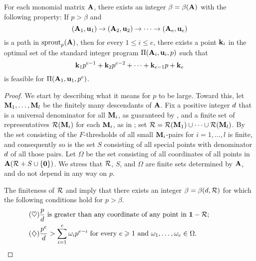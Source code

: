 \documentclass{amsart}
\begin{document}
\begin{theorem}
\label{ILL: T}
   For each monomial matrix $\mathbf{A}$, there exists an integer $\beta = \beta(\mathbf{A})$ with the following property\textup:
   If $p>\beta$ and \[ (\mathbf{A}_1, \mathbf{u}_1) \to (\mathbf{A}_2, \mathbf{u}_2) \to \cdots \to (\mathbf{A}_e, \mathbf{u}_e)\] is a path in $\operatorname{sprout}_p(\mathbf{A})$, then for every $1 \leq i \leq e$, there exists a point $\mathbf{k}_i$ in the optimal set of the standard integer program $\Pi(\mathbf{A}_i, \mathbf{u}_i,p)$  such that
   \[
      \mathbf{k}_1 p^{e-1} + \mathbf{k}_2 p^{e-2} + \cdots + \mathbf{k}_{e-1} p + \mathbf{k}_e
   \]
   is feasible for $\Pi(\mathbf{A}_1, \mathbf{u}_1, p^e)$.
 \end{theorem}

\begin{proof}
   We start by describing what it means for $p$ to be large.
   Toward this, let $\mathbf{M}_1, \ldots, \mathbf{M}_l$ be the finitely many descendants of  $\mathbf{A}$.
   Fix a positive integer $d$ that is a universal denominator for all $\mathbf{M}_i$, as guaranteed by , and a finite set of representatives $\mathcal{R}(\mathbf{M}_i)$ for each $\mathbf{M}_i$, as in ; set $\mathcal{R} = \mathcal{R}(\mathbf{M}_1) \cup \cdots \cup \mathcal{R}(\mathbf{M}_l)$.
   By  the set consisting of the $F$-thresholds of all small $\mathbf{M}_i$-pairs for $i=1,\ldots,l$ is finite, and consequently so is the set $S$ consisting of all special points with denominator $d$ of all those pairs.
   Let $\Omega$ be the set consisting of all coordinates of all points in $\mathbf{A}(\mathcal{R}+S\cup\{\mathbf{0}\})$.
   We stress that $\mathcal{R}$, $S$, and $\Omega$ are finite sets determined by $\mathbf{A}$, and do not depend in any way on $p$.

   The finiteness of $\mathcal{R}$  and 
   imply that there exists an integer $\beta = \beta(d, \mathcal{R})$ for which the following conditions hold for $p > \beta$.
    \begin{align}
      \tag{$\heartsuit$} \label{p-big-1}
      &\text{$\frac{p}{d}$ is greater than any coordinate of any point in $\mathbf{1} - \mathcal{R}$;}\qquad\qquad\quad \\
      \tag{$\diamondsuit$} \label{p-big-2}
      &\text{$\frac{p^e}{d} > \sum_{i=1}^e \omega_i p^{e-i}$ for every $e \geqslant 1$ and $\omega_1, \ldots, \omega_e \in \Omega$.}
    \end{align}


\end{proof}
\end{document}
